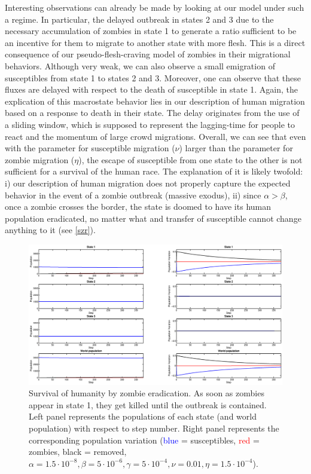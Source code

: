 \documentclass[11pt]{article} %
\begin{document}
Interesting observations can already be made by looking at our model under such a regime. In particular, the delayed outbreak in states 2 and 3 due to the necessary accumulation of zombies in state 1 to generate a ratio sufficient to be an incentive for them to migrate to another state with more flesh. This is a direct consequence of our pseudo-flesh-craving model of zombies in their migrational behaviors. Although very weak, we can also observe a small emigration of susceptibles from state 1 to states 2 and 3. Moreover, one can observe that these fluxes are delayed with respect to the death of susceptible in state 1. Again, the explication of this macrostate behavior lies in our description of human migration based on a response to death in their state. The delay originates from the use of a sliding window, which is supposed to represent the lagging-time for people to react and the momentum of large crowd migrations. Overall, we can see that even with the parameter for susceptible migration ($\nu$) larger than the parameter for zombie migration ($\eta$), the escape of susceptible from one state to the other is not sufficient for a survival of the human race. The explanation of it is likely twofold: i) our description of human migration does not properly capture the expected behavior in the event of a zombie outbreak (massive exodus), ii) since $\alpha>\beta$, once a zombie crosses the border, the state is doomed to have its human population eradicated, no matter what and transfer of susceptible cannot change anything to it (see \ref{szr}). 
\begin{figure}[h!]
\centerline{
\includegraphics[scale=0.35]{../images/Matlab_figures/example_zkill.eps}}
\caption{Survival of humanity by zombie eradication. As soon as zombies appear in state 1, they get killed until the outbreak is contained. Left panel represents the populations of each state (and world population) with respect to step number. Right panel represents the corresponding population variation (\textcolor{blue}{blue} = susceptibles, \textcolor{red}{red} = zombies, black = removed, $\alpha=1.5\cdot10^{-8}, \beta=5\cdot10^{-6}, \gamma=5\cdot10^{-4}, \nu=0.01, \eta=1.5\cdot10^{-4}$).
\label{skill} }
\end{figure}
\end{document}
